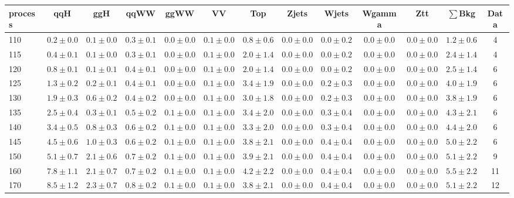 \begin{table}
{%
 \tiny
 \begin{center}
 \begin{tabular}{l | c c | c c c c c c c c  | c c}
 \hline
 process & qqH & ggH & qqWW & ggWW & VV & Top & Zjets & Wjets & Wgamma & Ztt & $\sum$Bkg & Data \\
\hline
110 & $0.2\pm0.0$ & $0.1\pm0.0$ & $0.3\pm0.1$ & $0.0\pm0.0$ & $0.1\pm0.0$ & $0.8\pm0.6$ & $0.0\pm0.0$ & $0.0\pm0.2$ & $0.0\pm0.0$ & $0.0\pm0.0$ & $1.2\pm0.6$ & 4 \\
115 & $0.4\pm0.1$ & $0.1\pm0.0$ & $0.3\pm0.1$ & $0.0\pm0.0$ & $0.1\pm0.0$ & $2.0\pm1.4$ & $0.0\pm0.0$ & $0.0\pm0.2$ & $0.0\pm0.0$ & $0.0\pm0.0$ & $2.4\pm1.4$ & 4 \\
120 & $0.8\pm0.1$ & $0.1\pm0.1$ & $0.4\pm0.1$ & $0.0\pm0.0$ & $0.1\pm0.0$ & $2.0\pm1.4$ & $0.0\pm0.0$ & $0.0\pm0.2$ & $0.0\pm0.0$ & $0.0\pm0.0$ & $2.5\pm1.4$ & 6 \\
125 & $1.3\pm0.2$ & $0.2\pm0.1$ & $0.4\pm0.1$ & $0.0\pm0.0$ & $0.1\pm0.0$ & $3.4\pm1.9$ & $0.0\pm0.0$ & $0.2\pm0.3$ & $0.0\pm0.0$ & $0.0\pm0.0$ & $4.0\pm1.9$ & 6 \\
130 & $1.9\pm0.3$ & $0.6\pm0.2$ & $0.4\pm0.2$ & $0.0\pm0.0$ & $0.1\pm0.0$ & $3.0\pm1.8$ & $0.0\pm0.0$ & $0.2\pm0.3$ & $0.0\pm0.0$ & $0.0\pm0.0$ & $3.8\pm1.9$ & 6 \\
135 & $2.5\pm0.4$ & $0.3\pm0.1$ & $0.5\pm0.2$ & $0.1\pm0.0$ & $0.1\pm0.0$ & $3.4\pm2.0$ & $0.0\pm0.0$ & $0.3\pm0.4$ & $0.0\pm0.0$ & $0.0\pm0.0$ & $4.3\pm2.1$ & 6 \\
140 & $3.4\pm0.5$ & $0.8\pm0.3$ & $0.6\pm0.2$ & $0.1\pm0.0$ & $0.1\pm0.0$ & $3.3\pm2.0$ & $0.0\pm0.0$ & $0.3\pm0.4$ & $0.0\pm0.0$ & $0.0\pm0.0$ & $4.4\pm2.0$ & 6 \\
145 & $4.5\pm0.6$ & $1.0\pm0.3$ & $0.6\pm0.2$ & $0.1\pm0.0$ & $0.1\pm0.0$ & $3.8\pm2.1$ & $0.0\pm0.0$ & $0.4\pm0.4$ & $0.0\pm0.0$ & $0.0\pm0.0$ & $5.0\pm2.2$ & 6 \\
150 & $5.1\pm0.7$ & $2.1\pm0.6$ & $0.7\pm0.2$ & $0.1\pm0.0$ & $0.1\pm0.0$ & $3.9\pm2.1$ & $0.0\pm0.0$ & $0.4\pm0.4$ & $0.0\pm0.0$ & $0.0\pm0.0$ & $5.1\pm2.2$ & 9 \\
160 & $7.8\pm1.1$ & $2.1\pm0.7$ & $0.7\pm0.2$ & $0.1\pm0.0$ & $0.1\pm0.0$ & $4.2\pm2.2$ & $0.0\pm0.0$ & $0.4\pm0.4$ & $0.0\pm0.0$ & $0.0\pm0.0$ & $5.5\pm2.2$ & 11 \\
170 & $8.5\pm1.2$ & $2.3\pm0.7$ & $0.8\pm0.2$ & $0.1\pm0.0$ & $0.1\pm0.0$ & $3.8\pm2.1$ & $0.0\pm0.0$ & $0.4\pm0.4$ & $0.0\pm0.0$ & $0.0\pm0.0$ & $5.1\pm2.2$ & 12 \\

\end{tabular}
\end{center}}
\end{table}
